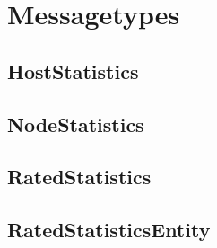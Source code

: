 \chapter{Messagetypes}

\section{HostStatistics}


\newpage

\section{NodeStatistics}


\newpage
\section{RatedStatistics}



\section{RatedStatisticsEntity}
